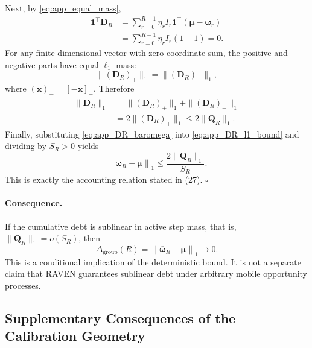 Next, by \eqref{eq:app_equal_mass},
\begin{align}
    \mathbf{1}^{\top}\mathbf{D}_R
    &=
    \sum_{r=0}^{R-1}
    \eta_rI_r
    \mathbf{1}^{\top}
    \left(
    \boldsymbol\mu-\boldsymbol\omega_r
    \right)
    \nonumber\\
    &=
    \sum_{r=0}^{R-1}
    \eta_rI_r(1-1)
    =0.
    \label{eq:app_DR_zero_sum}
\end{align}
For any finite-dimensional vector with zero coordinate sum, the positive and
negative parts have equal $\ell_1$ mass:
\begin{equation}
    \|(\mathbf{D}_R)_+\|_1
    =
    \|(\mathbf{D}_R)_-\|_1,
    \label{eq:app_pos_neg_equal}
\end{equation}
where $(\mathbf{x})_-=[-\mathbf{x}]_+$.  Therefore
\begin{equation}
\begin{aligned}
    \|\mathbf{D}_R\|_1
    &=
    \|(\mathbf{D}_R)_+\|_1
    +
    \|(\mathbf{D}_R)_-\|_1\\
    &=2\|(\mathbf{D}_R)_+\|_1
    \le
    2\|\mathbf{Q}_R\|_1.
\end{aligned}
    \label{eq:app_DR_l1_bound}
\end{equation}
Finally, substituting
\eqref{eq:app_DR_baromega} into
\eqref{eq:app_DR_l1_bound} and dividing by $S_R>0$ yields
\begin{equation}
    \left\|
    \overline{\boldsymbol\omega}_R
    -
    \boldsymbol\mu
    \right\|_1
    \le
    \frac{
    2\|\mathbf{Q}_R\|_1
    }{
    S_R
    }.
    \label{eq:app_debt_bound_final}
\end{equation}
This is exactly the accounting relation stated in
(27). \hfill$\square$

\paragraph{Consequence.}
If the cumulative debt is sublinear in active step mass, that is,
$\|\mathbf{Q}_R\|_1=o(S_R)$, then
\begin{equation}
    \Delta_{\mathrm{group}}(R)
    =
    \left\|
    \overline{\boldsymbol\omega}_R
    -
    \boldsymbol\mu
    \right\|_1
    \longrightarrow0.
    \label{eq:app_debt_sublinear_consequence}
\end{equation}
This is a conditional implication of the deterministic bound.  It is not a
separate claim that RAVEN guarantees sublinear debt under arbitrary mobile
opportunity processes.


\subsection{Supplementary Consequences of the Calibration Geometry}
\label{app:supp_calibration_geometry}

